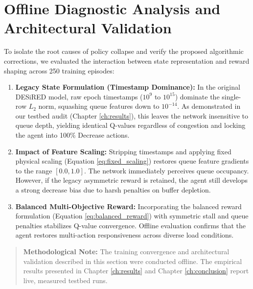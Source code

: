 \documentclass[12pt,a4paper,oneside]{report}
\begin{document}
\section{Offline Diagnostic Analysis and Architectural Validation}
To isolate the root causes of policy collapse and verify the proposed algorithmic corrections, we evaluated the interaction between state representation and reward shaping across 250 training episodes:
\begin{enumerate}[label=\arabic*.]
  \item \textbf{Legacy State Formulation (Timestamp Dominance):} In the original DESiRED model, raw epoch timestamps ($10^9$ to $10^{15}$) dominate the single-row $L_2$ norm, squashing queue features down to $10^{-14}$. As demonstrated in our testbed audit (Chapter \ref{ch:results}), this leaves the network insensitive to queue depth, yielding identical Q-values regardless of congestion and locking the agent into 100\% Decrease actions.
  \item \textbf{Impact of Feature Scaling:} Stripping timestamps and applying fixed physical scaling (Equation \ref{eq:fixed_scaling}) restores queue feature gradients to the range $[0.0, 1.0]$. The network immediately perceives queue occupancy. However, if the legacy asymmetric reward is retained, the agent still develops a strong decrease bias due to harsh penalties on buffer depletion.
  \item \textbf{Balanced Multi-Objective Reward:} Incorporating the balanced reward formulation (Equation \ref{eq:balanced_reward}) with symmetric stall and queue penalties stabilizes Q-value convergence. Offline evaluation confirms that the agent restores multi-action responsiveness across diverse load conditions.
\end{enumerate}

\begin{quote}
\small\textbf{Methodological Note:} The training convergence and architectural validation described in this section were conducted offline. The empirical results presented in Chapter \ref{ch:results} and Chapter \ref{ch:conclusion} report live, measured testbed runs.
\end{quote}
\end{document}
